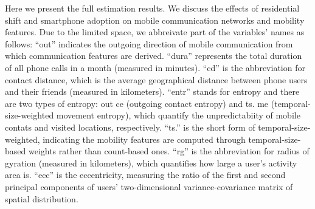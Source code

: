 
\label{complete_event_study_callaway}

Here we present the full estimation results. We discuss the effects of residential shift and smartphone adoption on mobile communication networks and mobility features. Due to the limited space, we abbreivate part of the variables' names as follows: ``out'' indicates the outgoing direction of mobile communication from which communication features are derived. ``dura'' represents the total duration of all phone calls in a month (measured in minutes). ``cd'' is the abbreviation for contact distance, which is the average geographical distance between phone users and their friends (measured in kilometers). ``entr'' stands for entropy and there are two types of entropy: out ce (outgoing contact entropy) and ts. me (temporal-size-weighted movement entropy), which quantify the unpredictabiity of mobile contats and visited locations, respectively. ``ts.'' is the short form of temporal-size-weighted, indicating the mobility features are computed through temporal-size-based weights rather than count-based ones. ``rg'' is the abbreviation for radius of gyration (measured in kilometers), which quantifies how large a user's activity area is. ``ecc'' is the eccentricity, measuring the ratio of the first and second principal components of users' two-dimensional variance-covariance matrix of spatial distribution.


